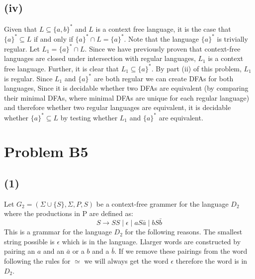 \documentclass[12pt]{article}
\begin{document}
\subsection*{(iv)} Given that $L \subseteq \{a,b\}^*$ and $L$ is a context free
language, it is the case that $\{a\}^* \subseteq L$ if and only if
$\{a\}^* \cap L=\{a\}^*$. Note that the language $\{a\}^*$ is trivially regular.
Let $L_1=\{a\}^* \cap L$. Since we have previously proven that context-free
languages are closed under intersection with regular languages, $L_1$ is a
context free language. Further, it is clear that $L_1 \subseteq \{a\}^*$.
By part (ii) of this problem, $L_1$ is regular. Since $L_1$ and $\{a\}^*$ are
both regular we can create DFAs for both languages, Since it is decidable
whether two DFAs are equivalent (by comparing their minimal DFAs, where minimal
DFAs are unique for each regular language) and therefore whether two regular
languages are equivalent, it is decidable whether $\{a\}^* \subseteq L$
by testing whether $L_1$ and $\{a\}^*$ are equivalent.

\section*{Problem B5}
\subsection*{(1)} Let $G_2 = (\Sigma\cup \{S\},\Sigma,P,S)$ be a context-free
grammer for the language $D_2$ where the productions in P are defined as:
$$ S \rightarrow SS \mid \epsilon \mid aS\bar a \mid bS\bar b$$
This is a grammar for the language $D_2$ for the following reasons.
The smallest string possible is $\epsilon$ which is in the language.
Llarger words are constructed by pairing an $a$ and an $\bar a$ or a $b$ and a
$ \bar b$. If we remove these pairings from the word following the rules for
$\simeq$ we will always get the word $\epsilon$ therefore the word is in $D_2$.
\end{document}
